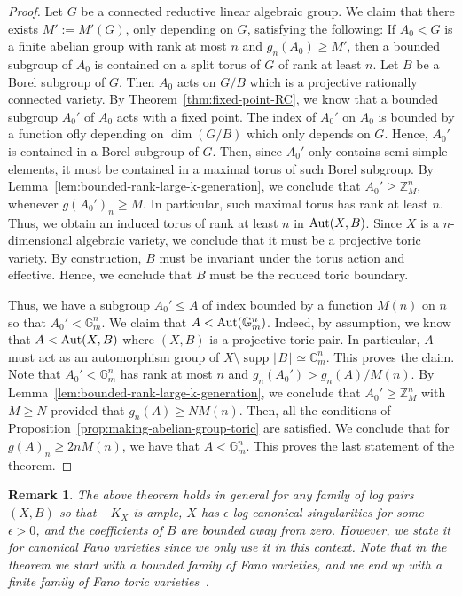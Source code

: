 \documentclass{amsart}
\newcommand{\supp}{\operatorname{supp}}
\newcommand{\zz}{\mathbb{Z}}
\newtheorem{remark}[theorem]{Remark}
\theoremstyle{remark}
\numberwithin{equation}{section}
\begin{document}
\begin{proof}
Let $G$ be a connected reductive linear algebraic group.
We claim that there exists $M':=M'(G)$, only depending on $G$, satisfying the following: If $A_0<G$ is a finite abelian group with
rank at most $n$ and $g_n(A_0)\geq M'$, then
a bounded subgroup of
$A_0$ is contained on a split torus of $G$ of rank at least $n$.
Let $B$ be a Borel subgroup of $G$.
Then $A_0$ acts on $G/B$ which is a projective rationally connected variety.
By Theorem~\ref{thm:fixed-point-RC}, we know that a bounded subgroup $A_0'$ of $A_0$ acts with a fixed point.
The index of $A_0'$ on $A_0$ is bounded by a function ofly depending on $\dim(G/B)$ which only depends on $G$.
Hence, $A_0'$ is contained in a Borel subgroup of $G$.
Then, since $A_0'$ only contains semi-simple elements, it must be contained in a maximal torus of such Borel subgroup.
By Lemma~\ref{lem:bounded-rank-large-k-generation},
we conclude that
$A_0'\geqslant \zz_M^n$, whenever $g(A_0')_n\geq M$.
In particular, such maximal torus has rank at least $n$.
Thus, we obtain an induced torus of rank at least $n$
in ${\rm Aut}(X,B)$.
Since $X$ is a $n$-dimensional algebraic variety, we conclude that it must be a projective toric variety.
By construction, $B$ must be invariant under the torus action and effective.
Hence, we conclude that $B$ must be the reduced toric boundary.

Thus, we have a subgroup $A_0'\leqslant A$ of index bounded by a function $M(n)$ on $n$
so that $A_0'<\mathbb{G}_m^n$.
We claim that $A<{\rm Aut}(\mathbb{G}_m^n)$.
Indeed, by assumption, we know that 
$A<{\rm Aut}(X,B)$ where $(X,B)$ is a projective toric pair.
In particular, $A$ must act as an automorphism group
of $X\setminus \supp \lfloor B\rfloor \simeq \mathbb{G}_m^n$.
This proves the claim.
Note that $A_0'<\mathbb{G}_m^n$ has rank at most $n$
and $g_n(A_0')>g_n(A)/M(n)$.
By Lemma~\ref{lem:bounded-rank-large-k-generation}, 
we conclude that $A_0'\geqslant \zz^n_M$ with $M\geq N$
provided that $g_n(A)\geq NM(n)$.
Then, all the conditions of Proposition~\ref{prop:making-abelian-group-toric}
are satisfied.
We conclude that for
$g(A)_n\geq 2nM(n)$, 
we have that $A<\mathbb{G}_m^n$.
This proves the last statement of the theorem.
\end{proof}

\begin{remark}{\em 
The above theorem holds in general for any family of log pairs $(X,B)$ so that
$-K_X$ is ample,
$X$ has $\epsilon$-log canonical singularities for some $\epsilon>0$,
and the coefficients of $B$ are bounded away from zero.
However, we state it for canonical Fano varieties since we only use it in this context.
Note that in the theorem we start with a bounded family of Fano varieties, and we end up with a finite family of Fano toric varieties~\cite{BB92}.}
\end{remark}
\end{document}
